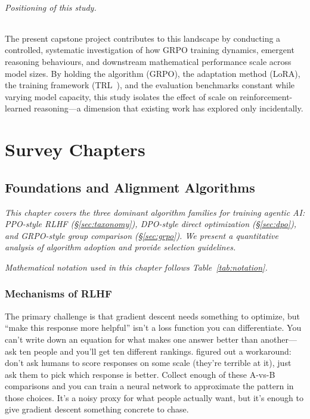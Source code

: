 \documentclass[12pt,a4paper]{report}
\theoremstyle{definition}
\begin{document}
\paragraph{Positioning of this study.} The present capstone project contributes to this landscape by conducting a controlled, systematic investigation of how GRPO training dynamics, emergent reasoning behaviours, and downstream mathematical performance scale across model sizes. By holding the algorithm (GRPO), the adaptation method (LoRA), the training framework (TRL~\cite{vonwerra2022trl}), and the evaluation benchmarks constant while varying model capacity, this study isolates the effect of scale on reinforcement-learned reasoning---a dimension that existing work has explored only incidentally.




\part{Survey Chapters}

\chapter{Foundations and Alignment Algorithms}
\label{ch:foundations}

\textit{This chapter covers the three dominant algorithm families for training agentic AI: PPO-style RLHF (\S\ref{sec:taxonomy}), DPO-style direct optimization (\S\ref{sec:dpo}), and GRPO-style group comparison (\S\ref{sec:grpo}). We present a quantitative analysis of algorithm adoption and provide selection guidelines.}

\vspace{0.3cm}

\noindent\textit{Mathematical notation used in this chapter follows Table~\ref{tab:notation}.}

\section{Mechanisms of RLHF}
The primary challenge is that gradient descent needs something to optimize, but ``make this response more helpful'' isn't a loss function you can differentiate. You can't write down an equation for what makes one answer better than another---ask ten people and you'll get ten different rankings. \citet{christiano2017deep} figured out a workaround: don't ask humans to score responses on some scale (they're terrible at it), just ask them to pick which response is better. Collect enough of these A-vs-B comparisons and you can train a neural network to approximate the pattern in those choices. It's a noisy proxy for what people actually want, but it's enough to give gradient descent something concrete to chase.
\end{document}
